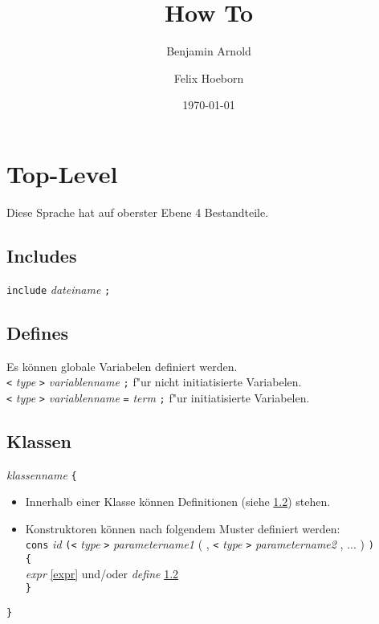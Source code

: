 \documentclass{article}
\begin{document}
\title{ How To }
\author{ Benjamin Arnold \and Felix Hoeborn }
\date{ \today }
\maketitle
\newpage
\tableofcontents
\newpage
\setcounter{page}{1}
\pagestyle{plain}

\section{Top-Level}
Diese Sprache hat auf oberster Ebene 4 Bestandteile.

\subsection{Includes}
\texttt{include} \textit{dateiname}  \texttt{;} \\

\subsection{Defines} \label{define}
Es können globale Variabelen definiert werden. \\
\texttt{<} \textit{type} \texttt{>} \textit{variablenname}  \texttt{;} f"ur nicht initiatisierte Variabelen. \\
\texttt{<} \textit{type} \texttt{>} \textit{variablenname} \texttt{=} \textit{term} \texttt{;} f"ur initiatisierte Variabelen.

\subsection{Klassen} \label{struct}
\textit{klassenname} \texttt{\{}
\begin{itemize}
\item[]{Innerhalb einer Klasse können Definitionen  {\small(siehe \ref{define})} stehen.}
\item[]{Konstruktoren können nach folgendem Muster definiert werden:\\
\texttt{cons} \textit{id} \texttt{(<} \textit{type} \texttt{>} \textit{parametername1} {\small( , \texttt{<} \textit{type} \texttt{>} \textit{parametername2} , ... )} \texttt{)}\\ 
\texttt{\{}\\
\textit{expr} {\tiny\ref{expr}} und/oder \textit{define} {\tiny\ref{define}}\\
\texttt{\}}}
\end{itemize}
\texttt{\}}
\end{document}
